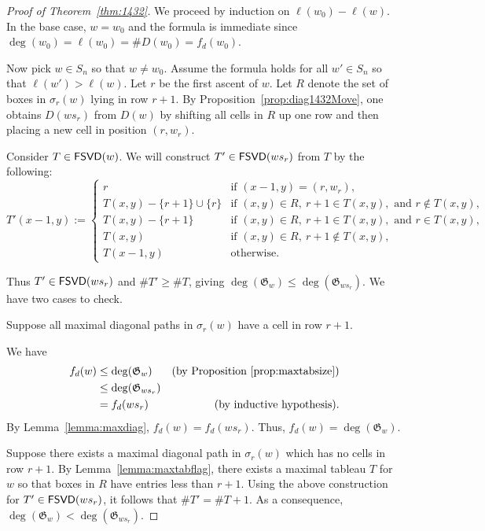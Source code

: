 \documentclass[12pt]{amsart}
\theoremstyle{definition}
\theoremstyle{remark}
\numberwithin{equation}{section}
\newcommand{\FSVD}{{\sf FSVD}}
\newcommand{\diagstat}{f_d}
\begin{document}
\begin{proof}[Proof of Theorem~\ref{thm:1432}]
	
	We proceed by induction on $\ell(w_0)-\ell(w)$.  In the base case, $w=w_0$ and the formula is immediate since $\deg(w_0)=\ell(w_0)=\#D(w_0)=\diagstat(w_0)$.
	
	Now pick $w\in S_n$ so that $w\neq w_0$.  Assume the formula holds for all $w'\in S_n$ so that $\ell(w')>\ell(w)$.  Let $r$ be the first ascent of $w$.  Let $R$ denote the set of boxes in $\sigma_r(w)$ lying in row $r+1$.
		By Proposition~\ref{prop:diag1432Move}, one obtains $D(ws_r)$ from $D(w)$ by shifting all cells in $R$ up one row and then placing a new cell in position $(r,w_r)$. 
		
		Consider $T\in \FSVD(w)$.
		We will construct $T'\in\FSVD(ws_r)$ from $T$ by the following:
		 \[T'(x-1,y):=\begin{cases}
    r &\text{if } (x-1,y)=(r,w_r),\\
    T(x,y)-\{r+1\}\cup\{r\} &\text{if } (x,y)\in R, \ r+1\in T(x,y), \text{ and } r\not\in T(x,y),\\
    T(x,y)-\{r+1\}&\text{if } (x,y)\in R, \ r+1\in T(x,y), \text{ and } r\in T(x,y), \\
    T(x,y) &\text{if } (x,y)\in R, \ r+1\not\in T(x,y), \\
    T(x-1,y) &\text{otherwise.}
	\end{cases}\]
		

	
	Thus $T'\in \FSVD(ws_r)$ and $\#T'\geq\#T$, giving $\deg(\mathfrak G_w)\leq\deg(\mathfrak G_{ws_r})$.
	We have two cases to check.
	
		
	 Suppose all maximal diagonal paths in $\sigma_r(w)$ have a cell in row $r+1$. 
	
We have 
\begin{align*}
	\diagstat(w)&\leq \deg(\mathfrak G_w) &\text{(by Proposition~\ref{prop:maxtabsize})}\\
		&\leq \deg(\mathfrak G_{ws_r}) & \\
		&=\diagstat(ws_r) &\text{(by inductive hypothesis).}
\end{align*}
	By Lemma~\ref{lemma:maxdiag}, $\diagstat(w)=\diagstat(ws_r)$.  Thus, $\diagstat(w)= \deg(\mathfrak G_w)$. 
	
	
	 Suppose there exists a maximal diagonal path in $\sigma_r(w)$ which has no cells in row $r+1$.
	By Lemma~\ref{lemma:maxtabflag}, there exists a maximal tableau $T$ for $w$ so that boxes in $R$ have entries less than $r+1$.  Using the above construction for $T'\in \FSVD(ws_r)$, it follows that $\#T'=\#T+1$.  As a consequence, $\deg(\mathfrak G_w)<\deg(\mathfrak G_{ws_r})$.
	


\end{proof}
\end{document}
